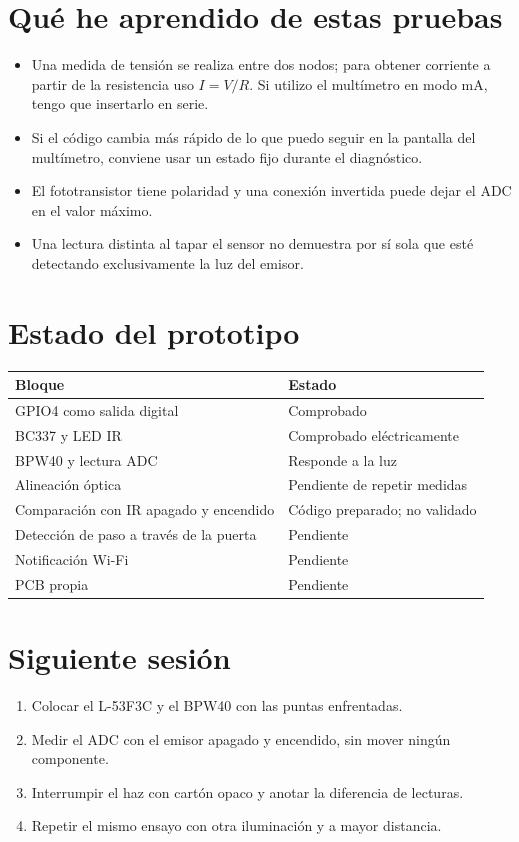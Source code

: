 \documentclass[10pt,a4paper]{article}
\begin{document}
\section{Qué he aprendido de estas pruebas}
\begin{itemize}
\item Una medida de tensión se realiza entre dos nodos; para obtener corriente a partir de la resistencia uso $I=V/R$. Si utilizo el multímetro en modo mA, tengo que insertarlo en serie.
\item Si el código cambia más rápido de lo que puedo seguir en la pantalla del multímetro, conviene usar un estado fijo durante el diagnóstico.
\item El fototransistor tiene polaridad y una conexión invertida puede dejar el ADC en el valor máximo.
\item Una lectura distinta al tapar el sensor no demuestra por sí sola que esté detectando exclusivamente la luz del emisor.
\end{itemize}

\section{Estado del prototipo}
\begin{center}
\begin{tabularx}{\linewidth}{@{}X l@{}}
\toprule
Bloque & Estado\\
\midrule
GPIO4 como salida digital & Comprobado\\
BC337 y LED IR & Comprobado eléctricamente\\
BPW40 y lectura ADC & Responde a la luz\\
Alineación óptica & Pendiente de repetir medidas\\
Comparación con IR apagado y encendido & Código preparado; no validado\\
Detección de paso a través de la puerta & Pendiente\\
Notificación Wi-Fi & Pendiente\\
PCB propia & Pendiente\\
\bottomrule
\end{tabularx}
\end{center}

\section{Siguiente sesión}
\begin{enumerate}
\item Colocar el L-53F3C y el BPW40 con las puntas enfrentadas.
\item Medir el ADC con el emisor apagado y encendido, sin mover ningún componente.
\item Interrumpir el haz con cartón opaco y anotar la diferencia de lecturas.
\item Repetir el mismo ensayo con otra iluminación y a mayor distancia.
\end{enumerate}
\end{document}
